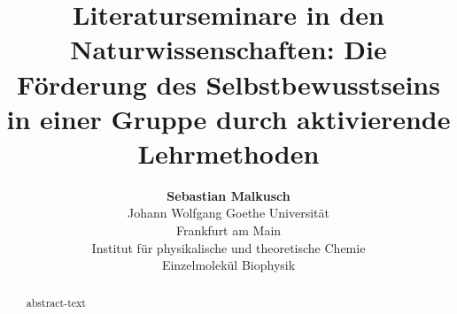 \documentclass[10pt,a4paper,onecolumn,notitlepage]{article}
\author{
	{\bf Sebastian Malkusch}\\Johann Wolfgang Goethe Universität\\Frankfurt am Main\\Institut für physikalische und theoretische Chemie\\Einzelmolekül Biophysik
}
\title{
Literaturseminare in den Naturwissenschaften: Die Förderung des Selbstbewusstseins in einer Gruppe durch aktivierende Lehrmethoden
}
\begin{document}
\maketitle
\begin{abstract}
   abstract-text
\end{abstract}
\tableofcontents
\twocolumn
\sloppy






%



\end{document}
